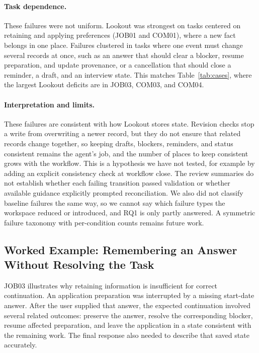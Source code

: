 \documentclass[twocolumn]{article}
\begin{document}
\paragraph{Task dependence.}
These failures were not uniform. Lookout was strongest on tasks centered on retaining and applying preferences (JOB01 and COM01), where a new fact belongs in one place. Failures clustered in tasks where one event must change several records at once, such as an answer that should clear a blocker, resume preparation, and update provenance, or a cancellation that should close a reminder, a draft, and an interview state. This matches Table~\ref{tab:cases}, where the largest Lookout deficits are in JOB03, COM03, and COM04.

\paragraph{Interpretation and limits.}
These failures are consistent with how Lookout stores state. Revision checks stop a write from overwriting a newer record, but they do not ensure that related records change together, so keeping drafts, blockers, reminders, and status consistent remains the agent's job, and the number of places to keep consistent grows with the workflow. This is a hypothesis we have not tested, for example by adding an explicit consistency check at workflow close. The review summaries do not establish whether each failing transition passed validation or whether available guidance explicitly prompted reconciliation. We also did not classify baseline failures the same way, so we cannot say which failure types the workspace reduced or introduced, and RQ1 is only partly answered. A symmetric failure taxonomy with per-condition counts remains future work.

\subsection{Worked Example: Remembering an Answer Without Resolving the Task}

JOB03 illustrates why retaining information is insufficient for correct continuation. An application preparation was interrupted by a missing start-date answer. After the user supplied that answer, the expected continuation involved several related outcomes: preserve the answer, resolve the corresponding blocker, resume affected preparation, and leave the application in a state consistent with the remaining work. The final response also needed to describe that saved state accurately.
\end{document}
